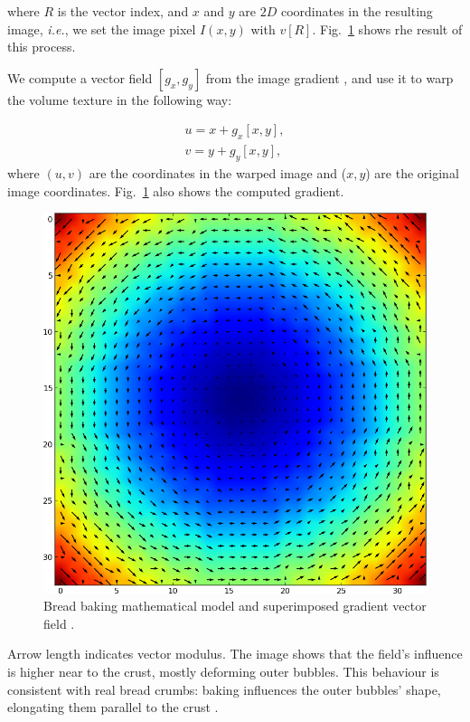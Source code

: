 \documentclass[final,5p,times]{elsarticle}
\begin{document}
\noindent where $R$ is the vector index, and $x$ and $y$ are $2D$ coordinates in the resulting image, {\em i.e.}, we set the image pixel $I(x,y)$ with $v[R]$. Fig.~\ref{FigBakingVectorField} shows rhe result of this process.

We compute a vector field $[g_{x},g_{y}]$ from the image gradient \cite{Gonzalez2006}, and use it to warp the volume texture in the following way:

\begin{eqnarray}
u = x+g_{x}[x,y],\\
v = y+g_{y}[x,y],
\end{eqnarray}
\noindent where $(u,v)$ are the coordinates in the warped image and ($x,y$) are the original image coordinates. Fig.~\ref{FigBakingVectorField} also shows the computed gradient. 


\begin{figure}
\includegraphics[scale=0.4]{vfield.png}
\caption{Bread baking mathematical model and superimposed gradient vector field .}
\label{FigBakingVectorField}
\end{figure}

Arrow length indicates vector modulus. The image shows that the field's influence is higher near to the crust, mostly deforming outer bubbles. This behaviour is consistent with real bread crumbs: baking influences the outer bubbles' shape, elongating them parallel to the crust \cite{Scanlon2001}.
\end{document}

